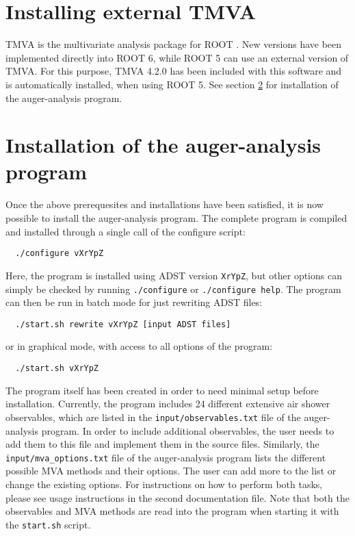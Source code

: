 \documentclass[12pt,a4paper]{report}
\begin{document}
\section{Installing external TMVA}
TMVA is the multivariate analysis package for ROOT \cite{tmva}. New versions have been implemented directly into ROOT 6, while ROOT 5 can use an external version of TMVA. For this purpose, TMVA 4.2.0 has been included with this software and is automatically installed, when using ROOT 5. See section \ref{sec:install} for installation of the auger-analysis program.

\section{Installation of the auger-analysis program} \label{sec:install}
Once the above prerequesites and installations have been satisfied, it is now possible to install the auger-analysis program. The complete program is compiled and installed through a single call of the configure script:
\footnotesize
\begin{verbatim}
  ./configure vXrYpZ
\end{verbatim}
\normalsize
Here, the program is installed using ADST version \texttt{XrYpZ}, but other options can simply be checked by running \texttt{./configure} or \texttt{./configure help}. The program can then be run in batch mode for just rewriting ADST files:
\footnotesize
\begin{verbatim}
  ./start.sh rewrite vXrYpZ [input ADST files]
\end{verbatim}
\normalsize
or in graphical mode, with access to all options of the program:
\footnotesize
\begin{verbatim}
  ./start.sh vXrYpZ
\end{verbatim}
\normalsize

{\noindent}The program itself has been created in order to need minimal setup before installation. Currently, the program includes 24 different extensive air shower observables, which are listed in the \texttt{input/observables.txt} file of the auger-analysis program. In order to include additional observables, the user needs to add them to this file and implement them in the source files. Similarly, the \texttt{input/mva\_options.txt} file of the auger-analysis program lists the different possible MVA methods and their options. The user can add more to the list or change the existing options. For instructions on how to perform both tasks, please see usage instructions in the second documentation file. Note that both the observables and MVA methods are read into the program when starting it with the \texttt{start.sh} script.
\end{document}
